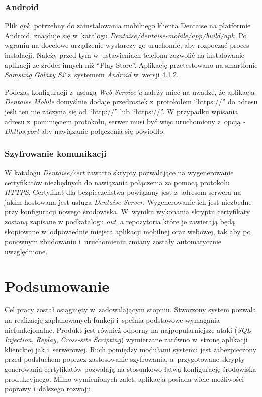 \documentclass[11pt]{aghdpl}
\begin{document}
\subsection{Android}

Plik \emph{apk}, potrzebny do zainstalowania mobilnego klienta Dentaise na platformie Android, znajduje się w~katalogu \emph{Dentaise/dentaise-mobile/app/build/apk}. Po wgraniu na docelowe urządzenie wystarczy go uruchomić, aby rozpocząć proces instalacji. Należy przed tym w~ustawieniach telefonu zezwolić na instalowanie aplikacji ze źródeł innych niż ``Play Store''. Aplikację przetestowano na smartfonie \emph{Samsung Galaxy S2} z~systemem \emph{Android} w~wersji 4.1.2.

Podczas konfiguracji z~usługą \emph{Web Service'u} należy mieć na uwadze, że aplikacja \emph{Dentaise Mobile} domyślnie dodaje przedrostek z~protokołem ``https://'' do adresu jeśli ten nie zaczyna się od ``http://'' lub ``https://''. W przypadku wpisania adresu z~pominięciem protokołu, serwer musi być więc uruchomiony z~opcją \emph{-Dhttps.port} aby nawiązanie połączenia się powiodło.

\subsection{Szyfrowanie komunikacji}

W katalogu \emph{Dentaise/cert} zawarto skrypty pozwalające na wygenerowanie certyfikatów niezbędnych do nawiązania połączenia za pomocą protokołu \emph{HTTPS}. Certyfikat dla bezpieczeństwa powiązany jest z~adresem serwera na jakim hostowana jest usługa \emph{Dentaise Server}. Wygenerowanie ich jest niezbędne przy konfiguracji nowego środowiska. W~wyniku wykonania skryptu certyfikaty zostaną zapisane w podkatalogu \emph{out}, a repozytoria które je zawierają będą skopiowane w~odpowiednie miejsca aplikacji mobilnej oraz webowej, tak aby po ponownym zbudowaniu i~uruchomieniu zmiany zostały automatycznie uwzględnione.

\chapter{Podsumowanie}
\label{cha:podsumowanie}

Cel pracy został osiągnięty w~zadowalającym stopniu. Stworzony system pozwala na realizację zaplanowanych funkcji i~spełnia podstawowe wymagania niefunkcjonalne. Produkt jest również odporny na najpopularniejsze ataki (\emph{SQL Injection}, \emph{Replay}, \emph{Cross-site Scripting}) wymierzane zarówno w~stronę aplikacji klienckiej jak i~serwerowej. Ruch pomiędzy modułami systemu jest zabezpieczony przed podsłuchem poprzez zastosowanie szyfrowania, a~przygotowane skrypty generowania certyfikatów pozwalają na stosunkowo łatwą konfigurację środowiska produkcyjnego. Mimo wymienionych zalet, aplikacja posiada wiele możliwości poprawy i~dalszego rozwoju.
\end{document}
